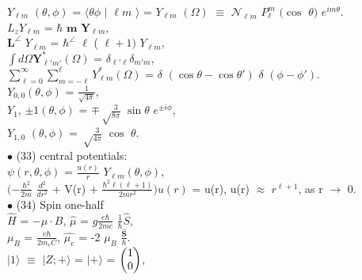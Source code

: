 \documentclass[a4paper, 10pt, onepage]{elegantbook}
\begin{document}
{$Y_{\ell m}$ $(\theta, \phi)$ = $\langle \theta \phi$ $\mid$  ${\ell m}$ $\rangle$ = $Y_{\ell m}$ $(\Omega)$ $\equiv$ $\mathcal N_{\ell m}$ $P^m_\ell$ $(\cos$ $\theta)$ $e^{i m \theta}$.  \\

$L_z Y_{\ell m}$ = $\hbar$ $\mathbf m$ $\mathbf Y_{\ell m}$, \\

$\mathbf L^\angle$ $Y_{\ell m}$ = $\hbar^\angle$ $\ell$ ( $\ell + 1 )$ $Y_{\ell m}$, \\

$\int d \Omega \mathbf Y^*_{\ell' m'} (\Omega)$ = $\delta_{\ell' \ell} \delta_{m' m}$,  \\

$\sum_{\ell = 0}^\infty \sum_{m = - \ell}^\ell Y^*_{\ell m} (\Omega)$ = $\delta$ $(\cos\theta - \cos\theta')$ $\delta$ $(\phi - \phi')$.  \\

$Y_{0,0}(\theta, \phi)$ = $\frac{1} {\sqrt{4 \pi}}$,  \\

$Y_1$, $\pm 1 (\theta, \phi)$ = $\mp {\sqrt \frac{3}{8 \pi}}$ $\sin \theta$ $e^{\pm i \phi}$, \\

$Y_{1,0}$ $(\theta, \phi)$ = ${\sqrt \frac{3}{4 \pi}}$ $\cos$ $\theta$. \\

$\bullet$ (33) central potentials:  \\

$\psi(r, \theta, \phi)$ = $\frac{u(r)}{r}$ $Y_{\ell m}(\theta, \phi)$,  \\  

$ (- {\frac{\hbar^2}{2m}}$ $ \frac{d^2}{dr^2}$ + V(r) + $\frac{\hbar^2 \ell (\ell + 1)} {2mr^2}) u(r) $ = u(r), u(r) $\approx$ $r^{\ell + 1}$, as r $\longrightarrow$ 0.  \\

$\bullet$ (34) Spin one-half \\

$\hat{H}$ = $- \mu \cdot B$, $\hat{\mu}$ = $ g \frac{e \hbar}{2mc}$ $\frac{1}{\hbar} \hat{S}$,  \\  

$\mu_B$ = $\frac{e \hbar}{2m_eC}$, $ \hat{\mu_e}$ = -2 $ \mu_B$ $\frac{\hat{\mathbf S}}{\hbar}$.  \\

$\mid 1 \rangle$ $\equiv$ $\mid Z; + \rangle$ = $\mid + \rangle$ = $\begin{pmatrix}1\cr0\cr\end{pmatrix}$,  \\ 

}
\end{document}
